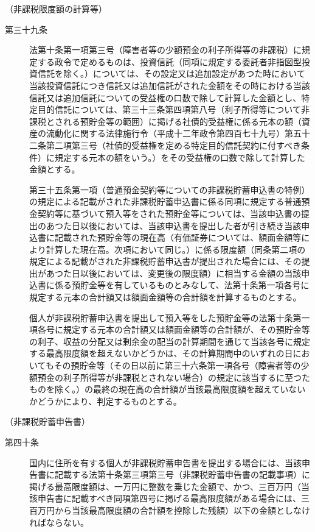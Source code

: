 \documentclass[twocolumn,a4j,10pt]{ltjtarticle}
\begin{document}
\noindent\hspace{10pt}（非課税限度額の計算等）
\begin{description}
\item[第三十九条]法第十条第一項第三号（障害者等の少額預金の利子所得等の非課税）に規定する政令で定めるものは、投資信託（同項に規定する委託者非指図型投資信託を除く。）については、その設定又は追加設定があつた時において当該投資信託につき信託又は追加信託がされた金額をその時における当該信託又は追加信託についての受益権の口数で除して計算した金額とし、特定目的信託については、第三十三条第四項第八号（利子所得等について非課税とされる預貯金等の範囲）に掲げる社債的受益権に係る元本の額（資産の流動化に関する法律施行令（平成十二年政令第四百七十九号）第五十二条第二項第三号（社債的受益権を定める特定目的信託契約に付すべき条件）に規定する元本の額をいう。）をその受益権の口数で除して計算した金額とする。
\item[]第三十五条第一項（普通預金契約等についての非課税貯蓄申込書の特例）の規定による記載がされた非課税貯蓄申込書に係る同項に規定する普通預金契約等に基づいて預入等をされた預貯金等については、当該申込書の提出のあつた日以後においては、当該申込書を提出した者が引き続き当該申込書に記載された預貯金等の現在高（有価証券については、額面金額等により計算した現在高。次項において同じ。）に係る限度額（同条第二項の規定による記載がされた非課税貯蓄申込書が提出された場合には、その提出があつた日以後においては、変更後の限度額）に相当する金額の当該申込書に係る預貯金等を有しているものとみなして、法第十条第一項各号に規定する元本の合計額又は額面金額等の合計額を計算するものとする。
\item[]個人が非課税貯蓄申込書を提出して預入等をした預貯金等の法第十条第一項各号に規定する元本の合計額又は額面金額等の合計額が、その預貯金等の利子、収益の分配又は剰余金の配当の計算期間を通じて当該各号に規定する最高限度額を超えないかどうかは、その計算期間中のいずれの日においてもその預貯金等（その日以前に第三十六条第一項各号（障害者等の少額預金の利子所得等が非課税とされない場合）の規定に該当するに至つたものを除く。）の最終の現在高の合計額が当該最高限度額を超えていないかどうかにより、判定するものとする。
\end{description}
\noindent\hspace{10pt}（非課税貯蓄申告書）
\begin{description}
\item[第四十条]国内に住所を有する個人が非課税貯蓄申告書を提出する場合には、当該申告書に記載する法第十条第三項第三号（非課税貯蓄申告書の記載事項）に掲げる最高限度額は、一万円に整数を乗じた金額で、かつ、三百万円（当該申告書に記載すべき同項第四号に掲げる最高限度額がある場合には、三百万円から当該最高限度額の合計額を控除した残額）以下の金額としなければならない。
\end{description}
\end{document}

